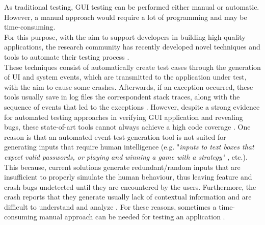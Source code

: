 As traditional testing, GUI testing can be performed either manual or automatic. However, a manual approach would require a lot of programming and may be time-consuming. \\  
For this purpose, with the aim to support developers in building high-quality applications, the research community has recently developed novel techniques and tools to automate their testing process \cite{sapienz, dynodroid ,muccini,Hu:2011:AGT:1982595.1982612}. \\
These techniques consist of automatically create test cases through the generation of UI and system events, which are transmitted to the application under test, with the aim to cause some crashes. Afterwards, if an exception occurred, these tools usually save in log files the correspondent stack traces, along with the sequence of events that led to the exceptions \cite{muccini}. 
However, despite a strong evidence for automated testing approaches in verifying GUI application and revealing bugs, these state-of-art tools cannot always achieve a high code coverage \cite{Nagappan2015}. 
One reason is that an automated event-test-generation tool is not suited for generating inputs that require human intelligence (e.g. "\textit{inputs to text boxes that expect valid passwords, or playing and winning a game with a strategy"} \cite{dynodroid}, etc.). This because, current solutions generate redundant/random inputs that are insufficient to properly simulate the human behaviour, thus leaving feature and crash bugs undetected until they are encountered by the users. Furthermore, the crash reports that they generate usually lack of contextual information and are difficult to understand and analyze \cite{Chen, Joorabchi}. 
For these reasons, sometimes a time-consuming manual approach can be needed for testing an application \cite{Nagappan2015}. \\

